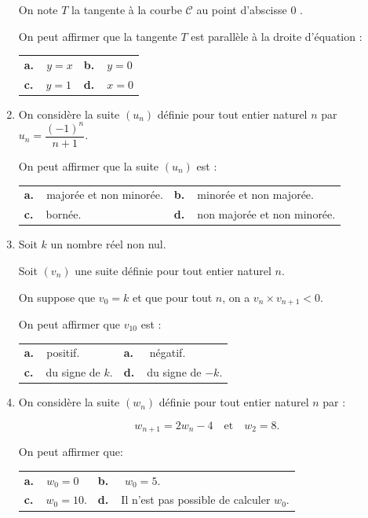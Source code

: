 \documentclass[10pt]{article}
\begin{document}
\begin{enumerate}
On note $T$ la tangente à la courbe $\mathcal{C}$ au point d'abscisse 0 .

On peut affirmer que la tangente $T$ est parallèle à la droite d'équation : 

\begin{center}
\begin{tabularx}{\linewidth}{*{2}{X}}
\textbf{a.~~}$y =x$ &\textbf{b.~~}$y = 0$\\
\textbf{c.~~}$y = 1$&\textbf{d.~~}$x = 0$
\end{tabularx}
\end{center}
\item On considère la suite $\left(u_n\right)$ définie pour tout entier naturel $n$ par $u_n = \dfrac{(-1)^n}{n+1}$.

On peut affirmer que la suite $\left(u_n\right)$ est : 

\begin{center}
\begin{tabularx}{\linewidth}{*{2}{X}}
\textbf{a.~~}majorée et non minorée.&\textbf{b.~~}minorée et non majorée.\\
\textbf{c.~~}bornée.				&\textbf{d.~~}non majorée et non minorée.
\end{tabularx}
\end{center}

\item Soit $k$ un nombre réel non nul.

Soit $\left(v_n\right)$  une suite définie pour tout entier naturel $n$.

On suppose que $v_0 = k$ et que pour tout $n$, on a $v_n \times v_{n+1} < 0$.

On peut affirmer que $v_{10}$ est :

\begin{center}
\begin{tabularx}{\linewidth}{*{2}{X}}
\textbf{a.~~}positif. &\textbf{a.~~} négatif.\\
\textbf{c.~~}du signe de $k$.&\textbf{d.~~}du signe de $- k$.
\end{tabularx}
\end{center}
\item On considère la suite $\left(w_n\right)$ définie pour tout entier naturel $n$ par : 

\[w_{n+1} = 2w_n - 4\quad \text{et}\quad  w_2 = 8.\]

On peut affirmer que:

\begin{center}
\begin{tabularx}{\linewidth}{*{2}{X}}
\textbf{a.~~}$w_0 = 0$&\textbf{b.~~} $w_0 = 5$.\\
\textbf{c.~~}$w_0 = 10$.&\textbf{d.~~}Il n'est pas possible de calculer $w_0$.
\end{tabularx}
\end{center}


\end{enumerate}
\end{document}
